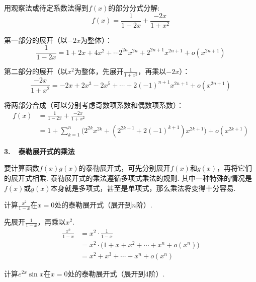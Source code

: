 \begin{solution}
用观察法或待定系数法得到$f(x)$的部分分式分解:
$$
f(x) = \frac{1}{1-2x} + \frac{-2x}{1+x^2}
$$\par
第一部分的展开（以$-2x$为整体）：
$$
\frac{1}{1-2x} = 1 +2x + 4x^2 + \cdots 2^{2n}x^{2n}+ 2^{2n+1}x^{2n+1} + o(x^{2n+1})
$$\par
第二部分的展开（以$x^2$为整体，先展开$\frac{1}{1+x^2}$，再乘以$-2x$）：
$$
\frac{-2x}{1+x^2} = -2x + 2x^3 - 2x^5 +\cdots + 2(-1)^{n+1}x^{2n+1} + o(x^{2n+1})
$$\par
将两部分合成（可以分别考虑奇数项系数和偶数项系数）：
\begin{equation}
    \begin{aligned}
        f(x) &= \frac{1}{1-2x} + \frac{-2x}{1+x^2} \\
        &= 1 + \sum_{k=1}^{n} \bigg( 2^{2k}x^{2k} + (2^{2k+1}+2(-1)^{k+1})x^{2k+1}  \bigg)  + o(x^{2k+1})
        \nonumber
    \end{aligned}
\end{equation}
\end{solution}

\textbf{3.~~泰勒展开式的乘法}\vspace{0.25em}

要计算函数$f(x)g(x)$的泰勒展开式，可先分别展开$f(x)$和$g(x)$，再将它们的展开式相乘.
泰勒展开式的乘法遵循多项式乘法的规则.
其中一种特殊的情况是$f(x)$或$g(x)$本身就是多项式，甚至是单项式，那么乘法将变得十分容易.

\begin{example}
\label{ex:ch04-05}
计算$\frac{x^2}{1-x}$在$x=0$处的泰勒展开式（展开到$n$阶）.
\end{example}

\begin{solution}
先展开$\frac{1}{1-x}$，再乘以$x^2$.
\begin{equation}
    \begin{aligned}
        \frac{x^2}{1-x} &= x^2 \cdot \frac{1}{1-x} \\
        &= x^2 \cdot \bigg( 1 + x + x^2 + \cdots + x^{n} + o(x^n)  \bigg) \\
        &= x^2 + x^3 + \cdots + x^{n} + o(x^n)
        \nonumber
    \end{aligned}
\end{equation}
\end{solution}

\begin{example}
\label{ex:ch04-06}
计算$e^{2x} \sin x$在$x=0$处的泰勒展开式（展开到$4$阶）.
\end{example}

